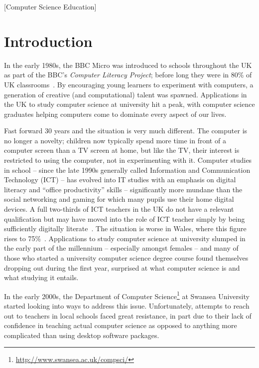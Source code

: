 \documentclass{sig-alternate}
\begin{document}
[Computer Science Education]


\section{Introduction}
In the early 1980s, the BBC Micro was introduced to schools throughout
the UK as part of the BBC's \emph{Computer Literacy Project}; before
long they were in 80\% of UK classrooms~\cite{vasko:1986}. By
encouraging young learners to experiment with computers, a generation
of creative (and computational) talent was spawned. Applications in
the UK to study computer science at university hit a peak, with
computer science graduates helping computers come to dominate every
aspect of our lives.

Fast forward 30 years and the situation is very much different. The
computer is no longer a novelty; children now typically spend more
time in front of a computer screen than a TV screen at home, but like
the TV, their interest is restricted to using the computer, not in
experimenting with it. Computer studies in school -- since the late
1990s generally called Information and Communication Technology (ICT)
-- has evolved into IT studies with an emphasis on digital literacy
and ``office productivity'' skills -- significantly more mundane than
the social networking and gaming for which many pupils use their home
digital devices. A full two-thirds of ICT teachers in the UK do not
have a relevant qualification but may have moved into the role of ICT
teacher simply by being sufficiently digitally
literate~\cite{RoyalSoc:2012}.  The situation is worse in Wales, where
this figure rises to 75\%~\cite{GTCW:2008}. Applications to study
computer science at university slumped in the early part of the
millennium -- especially amongst females -- and many of those who
started a university computer science degree course found themselves
dropping out during the first year, surprised at what computer science
is and what studying it entails.

In the early 2000s, the Department of Computer
Science\footnote{\url{http://www.swansea.ac.uk/compsci/}} at Swansea
University started looking into ways to address this issue.
Unfortunately, attempts to reach out to teachers in local schools
faced great resistance, in part due to their lack of confidence in
teaching actual computer science as opposed to anything more
complicated than using desktop software packages.
\end{document}

